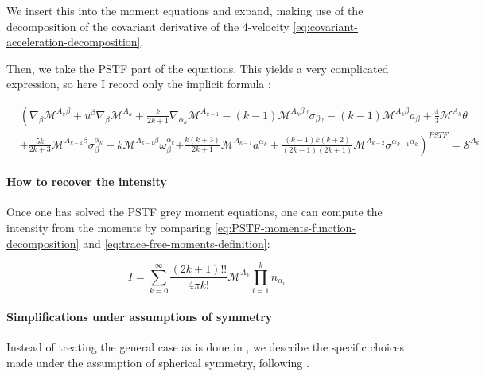\documentclass[main.tex]{subfiles}
\begin{document}
We insert this into the moment equations and expand, making use of the decomposition of the covariant derivative of the 4-velocity \eqref{eq:covariant-acceleration-decomposition}.

Then, we take the PSTF part of the equations. This yields a very complicated expression, so here I record only the implicit formula \cite[eq. 4.11c]{Thorne:1981feb}:

\begin{equation} \label{eq:PSTF-grey-moment-equations}
  \begin{split}
    &\left( \nabla _\beta \mathscr M ^{A_k \beta} + u^\beta \nabla_\beta \mathscr M ^{A_k}
    + \frac{k}{2k+1} \nabla_{\alpha_k} \mathscr M ^{A_{k-1}}
    - (k-1) \mathscr M ^{A_k \beta \gamma} \sigma_{\beta \gamma} \right.
    - (k-1) \mathscr M ^{A_k \beta} a_\beta
    + \frac{4}{3} \mathscr M ^{A_k} \theta \\
    &+ \frac{5k}{2k+3} \mathscr M ^{A_{k-1} \beta} \sigma_\beta^{\alpha_k}
    - k \mathscr M ^{A_{k-1} \beta} \omega_\beta ^{\alpha_k}
    \left.+ \frac{k (k+3)}{2k+1} \mathscr M ^{A_{k-1}} a^{\alpha_k}
    + \frac{(k-1) k (k+2) }{(2k-1) (2k+1)} \mathscr M ^{A_{k-2}} \sigma^{\alpha_{k-1} \alpha_k} \right)^{PSTF} = \mathscr S ^{A_k}
  \end{split}
\end{equation}

\paragraph{How to recover the intensity}

Once one has solved the PSTF grey moment equations, one can compute the intensity from the moments by comparing \eqref{eq:PSTF-moments-function-decomposition} and \eqref{eq:trace-free-moments-definition}:

\begin{equation}
  I = \sum _{k=0}   ^{\infty} \frac{(2k+1)!!}{4 \pi k!} \mathscr M^{A_k} \prod_{i=1}^k n_{\alpha_i}
\end{equation}

\paragraph{Simplifications under assumptions of symmetry}

Instead of treating the general case as is done in \cite[]{Thorne:1981feb}, we describe the specific choices made under the assumption of spherical symmetry, following \cite[]{ThorneFLammmangZytkow:1981feb}.
\end{document}
